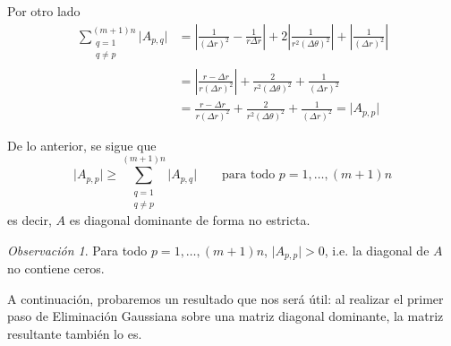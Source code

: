 \documentclass[11pt, a4paper, spanish]{article}
\theoremstyle{plain}
\theoremstyle{remark}
\newtheorem{obs}{Observación}
\begin{document}
\begin{itemize}
        Por otro lado
          \[ \begin{split}
            \sum_{\substack{q=1 \\ q \neq p}}^{(m+1)n} \vert A_{p,q} \vert &= \left \vert \frac{1}{(\Delta r)^2} - \frac{1}{r \Delta r} \right \vert + 2 \left \vert \frac{1}{r^2 (\Delta \theta)^2} \right \vert + \left \vert \frac{1}{(\Delta r)^2} \right \vert \\
            &= \left \vert \frac{r - \Delta r}{r (\Delta r)^2} \right \vert + \frac{2}{r^2 (\Delta \theta)^2} + \frac{1}{(\Delta r)^2} \\
            &= \frac{r - \Delta r}{r (\Delta r)^2} + \frac{2}{r^2 (\Delta \theta)^2} + \frac{1}{(\Delta r)^2} = \vert A_{p,p} \vert
          \end{split} \]

      \end{itemize}

      De lo anterior, se sigue que
        \[ \vert A_{p,p} \vert \geq \sum_{\substack{q=1 \\ q \neq p}}^{(m+1)n} \vert A_{p,q} \vert \qquad \text{para todo $p = 1, \dots, (m+1)n$} \]
      es decir, $A$ es diagonal dominante de forma no estricta.

      \begin{obs}
        \label{obs:Diagonal de A sin ceros}
        Para todo $p = 1, \dots, (m+1)n$, $\vert A_{p,p} \vert > 0$, i.e. la diagonal de $A$ no contiene ceros.
      \end{obs}

      A continuación, probaremos un resultado que nos será útil: al realizar el primer paso de Eliminación Gaussiana sobre una matriz diagonal dominante, la matriz resultante también lo es.
\end{document}
